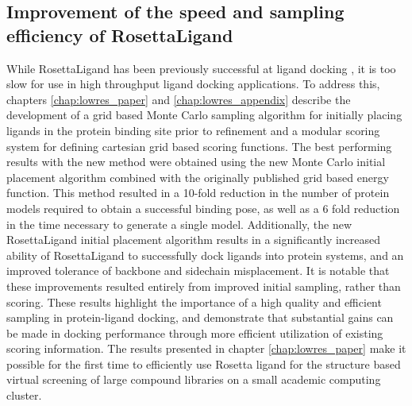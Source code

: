 \subsection{Improvement of the speed and sampling efficiency of RosettaLigand}
While RosettaLigand has been previously successful at ligand docking \citep{Lemmon:2012ku,Combs:2011db,Allison:2013ir}, it is too slow for use in high throughput ligand docking applications.
To address this, chapters \ref{chap:lowres_paper} and \ref{chap:lowres_appendix} describe the development of a grid based Monte Carlo sampling algorithm for initially placing ligands in the protein binding site prior to refinement and a modular scoring system for defining cartesian grid based scoring functions.
The best performing results with the new method were obtained using the new Monte Carlo initial placement algorithm combined with the originally published grid based energy function.
This method resulted in a 10-fold reduction in the number of protein models required to obtain a successful binding pose, as well as a 6 fold reduction in the time necessary to generate a single model.
Additionally, the new RosettaLigand initial placement algorithm results in a significantly increased ability of RosettaLigand to successfully dock ligands into protein systems, and an improved tolerance of backbone and sidechain misplacement.
It is notable that these improvements resulted entirely from improved initial sampling, rather than scoring.
These results highlight the importance of a high quality and efficient sampling in protein-ligand docking, and demonstrate that substantial gains can be made in docking performance through more efficient utilization of existing scoring information.
The results presented in chapter \ref{chap:lowres_paper} make it possible for the first time to efficiently use Rosetta ligand for the structure based virtual screening of large compound libraries on a small academic computing cluster.

